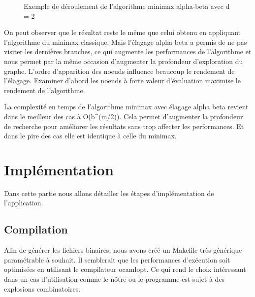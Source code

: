 \documentclass[11pt]{article}
\begin{document}
\begin{figure}[h]
  \caption {Exemple de déroulement de l'algorithme minimax alpha-beta avec d = 2}
  \noindent{}
\end{figure}

On peut observer que le résultat reste le même que celui obtenu en
appliquant l'algorithme du minimax classique. Mais l'élagage alpha beta a
permis de ne pas visiter les dernières branches, ce qui augmente les
performances de l'algorithme et nous permet par la même occasion
d'augmenter la profondeur d'exploration du graphe. L'ordre d'apparition des
noeuds influence beaucoup le rendement de l'élagage. Examiner d'abord les
noeuds à forte valeur d'évaluation maximise le rendement de
l'algorithme.

La complexité en temps de l'algorithme minimax avec élagage alpha beta
revient dans le meilleur des cas à O(b\^{}(m/2)). Cela permet d'augmenter
la profondeur de recherche pour améliorer les résultats sans trop
affecter les performances. Et dans le pire des cas elle est identique à
celle du minimax.


\section{Implémentation}

Dans cette partie nous allons détailler les étapes d'implémentation de l'application. 

\subsection{Compilation}

Afin de générer les fichiers binaires, nous avons créé un Makefile très générique paramétrable à souhait. Il semblerait que les performances d'exécution soit optimisées en utilisant le compilateur ocamlopt. Ce qui rend le choix intéressant  dans un cas d'utilisation comme le nôtre ou le programme est sujet à des explosions combinatoires. 
\end{document}
